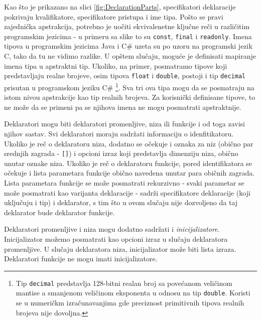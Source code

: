 Kao što je prikazano na slici \ref{fig:DeclarationParts}, specifikatori deklaracije pokrivaju kvalifikatore, specifikatore pristupa i ime tipa. Pošto se pravi zajednička apstrakcija, potrebno je uočiti ekvivalenetne ključne reči u različitim programskim jezicima - u primeru sa slike to su \texttt{const}, \texttt{final} i \texttt{readonly}. Imena tipova u programskim jezicima Java i C\# uzeta su po uzoru na programski jezik C, tako da tu ne vidimo razlike. U opštem slučaju, moguće je definisati mapiranje imena tipa u apstraktni tip. Ukoliko, na primer, posmatramo tipove koji predstavljaju realne brojeve, osim tipova \texttt{float} i \texttt{double}, postoji i tip \texttt{decimal} prisutan u programskom jeziku C\# \footnote{Tip \texttt{decimal} predstavlja 128-bitni realan broj sa povećanom veličinom mantise a smanjenom veličinom eksponenta u odnosu na tip \texttt{double}. Koristi se u numeričkm izračunavanjima gde preciznost primitivnih tipova realnih brojeva nije dovoljna.}. Sva tri ova tipa mogu da se posmatraju na istom nivou apstrakcije kao tip realnih brojeva. Za korisnički definisane tipove, to ne može da se primeni pa se njihova imena ne mogu posmatrati apstraktnije.

Deklaratori mogu biti deklaratori promenljive, niza ili funkcije i od toga zavisi njihov sastav. Svi deklaratori moraju sadržati informaciju o idenfitikatoru. Ukoliko je reč o deklaratoru niza, dodatno se očekuje i oznaka za niz (obično par srednjih zagrada - \texttt{[]}) i opcioni izraz koji predstavlja dimenziju niza, obično unutar oznake niza. Ukoliko je reč o deklaratoru funkcije, pored identifikatora se očekuje i lista parametara funkcije obično navedena unutar para običnih zagrada. Lista parametara funkcije se može posmatrati rekurzivno - svaki parametar se može posmatrati kao varijanta deklaracije - sadrži specifikatore deklaracije (koji uključuju i tip) i deklarator, s tim što u ovom slučaju nije dozvoljeno da taj deklarator bude deklarator funkcije. 

Deklaratori promenljive i niza mogu dodatno sadržati i \emph{inicijalizatore}. Inicijalizator možemo posmatrati kao opcioni izraz u slučaju deklaratora promenljive. U slučaju deklaratora niza, inicijalizator može biti lista izraza. Deklaratori funkcije ne mogu imati inicijalizatore.

